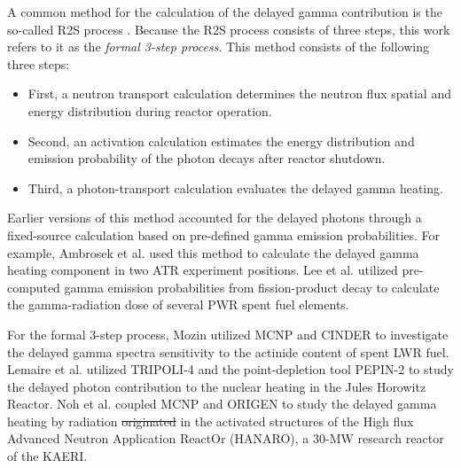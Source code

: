 \documentclass{style/nseJournal}
\providecommand{\DIFadd}[1]{{\protect\color{blue}\uwave{#1}}} %
\providecommand{\DIFdel}[1]{{\protect\color{red}\sout{#1}}}                      %
\providecommand{\DIFaddbegin}{} %
\providecommand{\DIFaddend}{} %
\providecommand{\DIFdelbegin}{} %
\providecommand{\DIFdelend}{} %
\begin{document}
A common method for the calculation of the delayed gamma contribution is the so-called \gls*{R2S} process \cite{chen_rigorous_2002}.
Because the \gls*{R2S} process consists of three steps, this work refers to it as the \textit{formal 3-step process}.
This method consists of the following three steps:
\begin{itemize}
  \item First, a neutron transport calculation determines the neutron flux spatial and energy distribution during reactor operation.
  \item Second, an activation calculation estimates the energy distribution and emission probability of the photon decays after reactor shutdown.
  \item Third, a photon-transport calculation evaluates the delayed gamma heating.
\end{itemize}

Earlier versions of this method accounted for the delayed photons through a fixed-source calculation based on pre-defined gamma emission probabilities.
For example, Ambrosek et al. \cite{ambrosek_improved_1995} used this method to calculate the delayed gamma heating component in two \gls*{ATR} experiment positions.
Lee et al. \cite{lee_tripoli_2013} utilized pre-computed gamma emission probabilities from fission-product decay to calculate the gamma-radiation dose of several \gls*{PWR} spent fuel elements.

For the formal 3-step process, Mozin \cite{mozin_delayed_2011} utilized MCNP \cite{mcnp} and CINDER \cite{mcnp-cinder} to investigate the delayed gamma spectra sensitivity to the actinide content of spent LWR fuel.
Lemaire et al. \cite{lemaire_estimation_2015} utilized TRIPOLI-4 \cite{tripoli4} and the point-depletion tool PEPIN-2 \cite{pepin2} to study the delayed photon contribution to the nuclear heating in the Jules Horowitz Reactor.
Noh et al. \cite{noh_estimation_2018} coupled MCNP and ORIGEN to study the delayed gamma heating by radiation \DIFdelbegin \DIFdel{originated }\DIFdelend \DIFaddbegin \DIFadd{originating }\DIFaddend in the activated structures of the High flux Advanced Neutron Application ReactOr (HANARO), a 30-MW research reactor of the \gls*{KAERI}.
\end{document}
